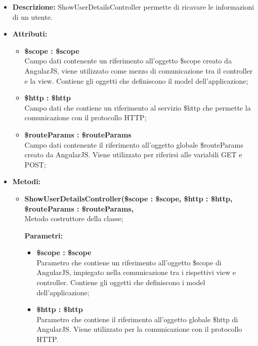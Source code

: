 \begin{itemize}
	\item \textbf{Descrizione:} ShowUserDetailsController permette di ricavare le informazioni di un utente.
	\item \textbf{Attributi:}
	\begin{itemize}
		
		\item \textbf{\$scope : \$scope}\\
		Campo dati contenente un riferimento all'oggetto \$scope creato da AngularJS, viene utilizzato come mezzo di comunicazione tra il controller e la view. Contiene gli oggetti che definiscono il model dell'applicazione;
		
		\item \textbf{\$http : \$http }\\
		Campo dati che contiene un riferimento al servizio \$http che permette la comunicazione con il protocollo HTTP;
		
		\item \textbf{\$routeParams : \$routeParams }\\
		Campo dati contenente il riferimento all'oggetto globale \$routeParams creato da AngularJS. Viene utilizzato per riferirsi alle variabili GET e POST;	
		
	\end{itemize}
	\item \textbf{Metodi:}
	\begin{itemize}
		
		\item \textbf{ShowUserDetailsController(\$scope : \$scope, \$http : \$http, \$routeParams : \$routeParams,}\\
		Metodo costruttore della classe;
		\begin{description}
			\item[\textbf{Parametri:}]
		\end{description}
		\begin{itemize}
			\item \textbf{\$scope : \$scope}\\
			Parametro che contiene un riferimento all'oggetto \$scope di AngularJS, impiegato nella comunicazione tra i rispettivi view e controller. Contiene gli oggetti che definiscono i model dell'applicazione;
			
			\item \textbf{\$http : \$http}\\
			Parametro che contiene il riferimento all'oggetto globale \$http di AngularJS. Viene utilizzato per la comunicazione con il protocollo HTTP.
			

\end{itemize}
\end{itemize}
\end{itemize}
